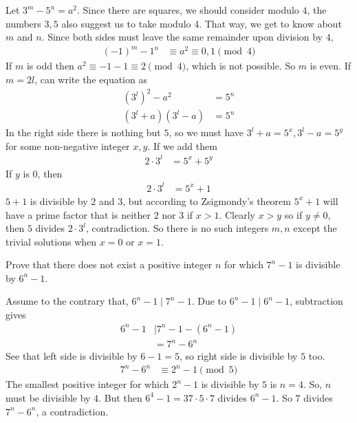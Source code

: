 \documentclass[problems.tex]{subfile}
\begin{document}
	\begin{solution}
		Let $3^m-5^n=a^2$. Since there are squares, we should consider modulo $4$, the numbers $3,5$ also suggest us to take modulo $4$. That way, we get to know about $m$ and $n$. Since both sides must leave the same remainder upon division by $4$,
		\begin{align*}
			(-1)^m-1^n &\equiv a^2\equiv0,1\pmod4
		\end{align*}
		If $m$ is odd then $a^2\equiv-1-1\equiv2\pmod4$, which is not possible. So $m$ is even.  If $m=2l$, can write the equation as
		\begin{align*}
			\left(3^l\right)^2-a^2 & = 5^n\\
			(3^l+a)(3^l-a) & = 5^n
		\end{align*}
		In the right side there is nothing but $5$, so we must have $3^l+a=5^x,3^l-a=5^y$ for some non-negative integer $x,y$. If we add them
			\begin{align*}
				2\cdot3^l & = 5^x+5^y
			\end{align*}
		If $y$ is $0$, then
			\begin{align*}
				2\cdot3^l & = 5^x+1
			\end{align*}
		$5+1$ is divisible by $2$ and $3$, but according to Zsigmondy's theorem $5^x+1$ will have a prime factor that is neither $2$ nor $3$ if $x>1$. Clearly $x>y$ so if $y\neq0$, then $5$ divides $2\cdot3^l$, contradiction. So there is no such integers $m,n$ except the trivial solutions when $x=0$ or $x=1$.
	\end{solution}

	\begin{problem}[Croatia $2015$]
		Prove that there does not exist a positive integer $n$ for which $7^n-1$ is divisible by $6^n-1$.
	\end{problem}

	\begin{solution}
		Assume to the contrary that, $6^n-1\mid 7^n-1$. Due to $6^n-1\mid 6^n-1$, subtraction gives
			\begin{align*}
				6^n-1
					& \mid 7^n-1-(6^n-1)\\
					& = 7^n-6^n
			\end{align*}
		See that left side is divisible by $6-1=5$, so right side is divisible by $5$ too.
			\begin{align*}
				7^n-6^n
					&\equiv2^n-1\pmod5
			\end{align*}
		The smallest positive integer for which $2^n-1$ is divisible by $5$ is $n=4$. So, $n$ must be divisible by $4$. But then $6^4-1=37\cdot5\cdot7$ divides $6^n-1$. So $7$ divides $7^n-6^n$, a contradiction.
	\end{solution}
\end{document}
